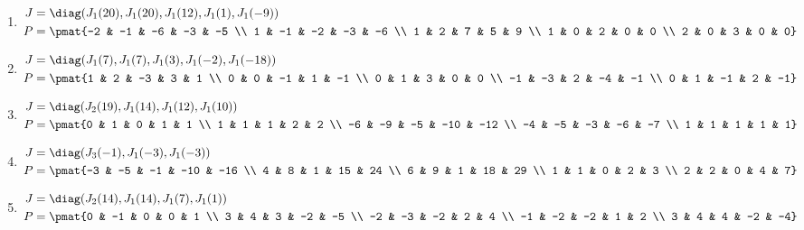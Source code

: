 \begin{enumerate}
\item

\begin{align*}
J &= \diag(J_{1}(20), J_{1}(20), J_{1}(12), J_{1}(1), J_{1}(-9))\\
P &= \pmat{-2 & -1 & -6 & -3 & -5 \\ 1 & -1 & -2 & -3 & -6 \\ 1 & 2 & 7 & 5 & 9 \\ 1 & 0 & 2 & 0 & 0 \\ 2 & 0 & 3 & 0 & 0}
\end{align*}

\item

\begin{align*}
J &= \diag(J_{1}(7), J_{1}(7), J_{1}(3), J_{1}(-2), J_{1}(-18))\\
P &= \pmat{1 & 2 & -3 & 3 & 1 \\ 0 & 0 & -1 & 1 & -1 \\ 0 & 1 & 3 & 0 & 0 \\ -1 & -3 & 2 & -4 & -1 \\ 0 & 1 & -1 & 2 & -1}
\end{align*}

\item

\begin{align*}
J &= \diag(J_{2}(19), J_{1}(14), J_{1}(12), J_{1}(10))\\
P &= \pmat{0 & 1 & 0 & 1 & 1 \\ 1 & 1 & 1 & 2 & 2 \\ -6 & -9 & -5 & -10 & -12 \\ -4 & -5 & -3 & -6 & -7 \\ 1 & 1 & 1 & 1 & 1}
\end{align*}

\item

\begin{align*}
J &= \diag(J_{3}(-1), J_{1}(-3), J_{1}(-3))\\
P &= \pmat{-3 & -5 & -1 & -10 & -16 \\ 4 & 8 & 1 & 15 & 24 \\ 6 & 9 & 1 & 18 & 29 \\ 1 & 1 & 0 & 2 & 3 \\ 2 & 2 & 0 & 4 & 7}
\end{align*}

\item

\begin{align*}
J &= \diag(J_{2}(14), J_{1}(14), J_{1}(7), J_{1}(1))\\
P &= \pmat{0 & -1 & 0 & 0 & 1 \\ 3 & 4 & 3 & -2 & -5 \\ -2 & -3 & -2 & 2 & 4 \\ -1 & -2 & -2 & 1 & 2 \\ 3 & 4 & 4 & -2 & -4}
\end{align*}


\end{enumerate}
